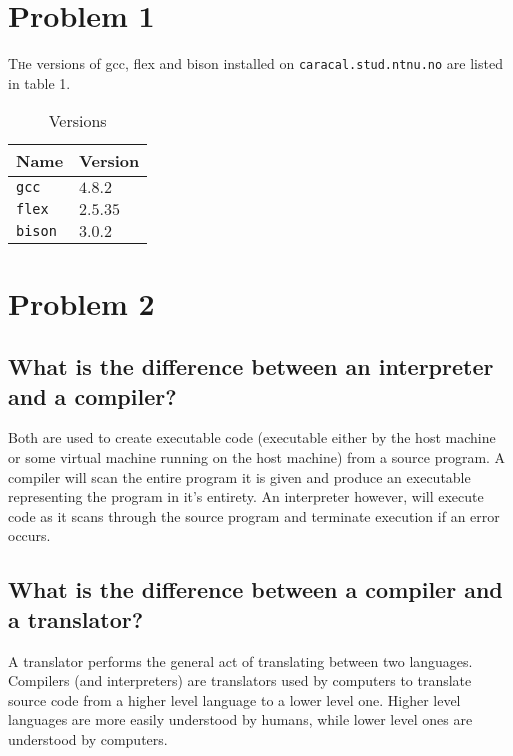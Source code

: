 \documentclass[twoside]{article}
\begin{document}
\begin{multicols}{2} %

\section{Problem 1}

\lettrine[nindent=0em,lines=3]{T} he versions of gcc, flex and bison installed on \texttt{caracal.stud.ntnu.no} are listed in table 1.

\begin{table}[H]
\caption{Versions}
\centering
\begin{tabular}{ll}
\toprule
Name & Version \\
\midrule
\texttt{gcc} & $4.8.2$ \\
\texttt{flex} & $2.5.35$ \\
\texttt{bison} & $3.0.2$ \\
\bottomrule
\end{tabular}
\end{table}



\section{Problem 2}

\subsection{What is the difference between an interpreter and a compiler?}

Both are used to create executable code (executable either by the host machine or some virtual machine running on the host machine) from a source program.
A compiler will scan the entire program it is given and produce an executable representing the program in it's entirety.
An interpreter however, will execute code as it scans through the source program and terminate execution if an error occurs.

\subsection{What is the difference between a compiler and a translator?}

A translator performs the general act of translating between two languages.
Compilers (and interpreters) are translators used by computers to translate source code from a higher level language to a lower level one. 
Higher level languages are more easily understood by humans, while lower level ones are understood by computers.



\end{multicols}
\end{document}
